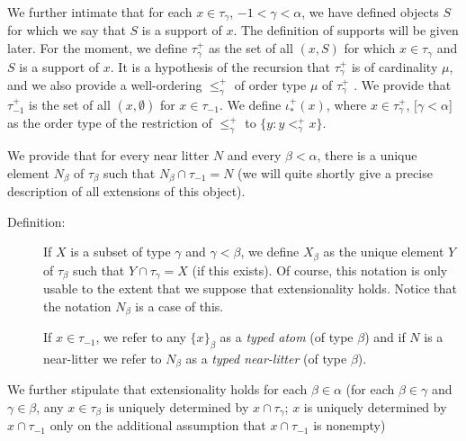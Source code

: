 \documentclass[112pt]{article}
\begin{document}
\begin{description}
We further intimate that for each $x \in \tau_\gamma$, $-1<\gamma<\alpha$, we have defined objects $S$ for which we say that $S$ is a support of $x$.  The definition of supports will be given later.  For the moment, we define $\tau_\gamma^+$ as the set of all $(x,S)$ for which $x \in \tau_\gamma$ and $S$ is a support of $x$.  It is a hypothesis of the recursion
that $\tau_\gamma^+$ is of cardinality $\mu$, and we also provide a well-ordering $\leq^+_\gamma$ of order type $\mu$ of $\tau_\gamma^+$ .   We provide that $\tau_{-1}^+$ is the set
of all $(x,\emptyset)$ for $x \in \tau_{-1}$.   We define $\iota^+_*(x)$, where $x \in \tau_\gamma^+$, $[\gamma <\alpha$] as the order type of the restriction of $\leq^+_\gamma$ to
$\{y:y <^+_\gamma x\}$.


We provide that for every near litter $N$ and every $\beta<\alpha$, there is a unique element $N_\beta$ of $\tau_\beta$ such that $N_\beta \cap \tau_{-1}=N$ (we will quite shortly give a precise description of all extensions of this object).

\begin{description}

\item[Definition:]  If $X$ is a subset of type $\gamma$ and $\gamma<\beta$, we define $X_\beta$ as the unique element $Y$ of $\tau_\beta$
such that $Y \cap \tau_\gamma = X$ (if this exists).  Of course, this notation is only usable to the extent that we suppose that extensionality holds.  Notice
that the notation $N_\beta$ is a case of this.

If $x \in \tau_{-1}$, we refer to any $\{x\}_\beta$ as a {\em typed atom\/} (of type $\beta$) and if $N$ is a near-litter we refer to $N_\beta$ as a {\em typed near-litter\/} (of type $\beta$).

\end{description}

We further stipulate that extensionality holds for each $\beta\in \alpha$ (for each $\beta\in \gamma$ and $\gamma \in \beta$, any $x \in \tau_\beta$ is uniquely determined by $x \cap \tau_\gamma$;  $x$ is uniquely determined by $x \cap \tau_{-1}$ only on the additional assumption that $x \cap \tau_{-1}$ is nonempty)

\begin{comment}[  NOTE: I do not know whether this condition is still in use:  , and that for any $\beta \in \alpha$ and $x \in \tau_{-1}$, $\iota_*(\{x\}_\beta) = \iota_*(\{x\}_0)$].

\end{comment}


\end{description}
\end{document}
